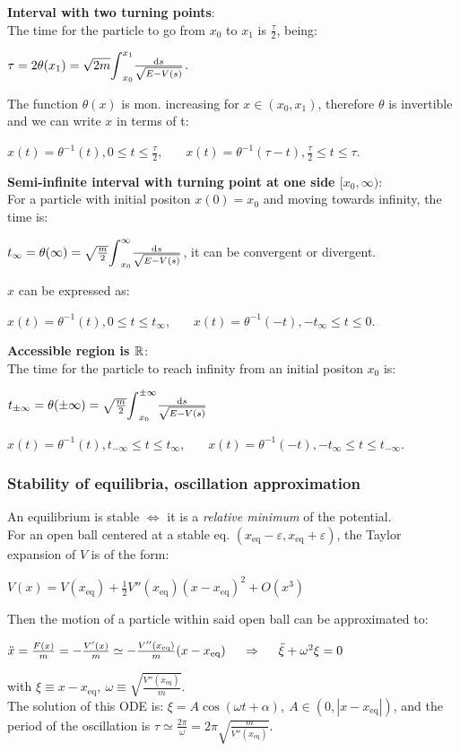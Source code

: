 \textbf{Interval with two turning points}:\\
The time for the particle to go from $x_{0}$ to $x_{1}$ is $\frac{\tau}{2}$, being:\\
\centerline{$\tau=2\theta(x_{1})=\sqrt{2m}\scaleint{5ex}_{x_{0}}^{x_{1}}\frac{\dd{s}}{\sqrt{E-V(s)}}$.}

The function $\theta(x)$ is mon. increasing for $x\in(x_{0},x_{1})$, therefore $\theta$ is invertible and we can write $x$ in terms of t:
\\[2pt]
\centerline{$x(t)=\theta^{-1}(t), 0\leq t\leq \frac{\tau}{2},\ \ \ \ \ \ \ \ 
x(t)=\theta^{-1}(\tau-t), \frac{\tau}{2}\leq t\leq \tau$.}
\smallskip

\textbf{Semi-infinite interval with turning point at one side $[x_{0},\infty)$}:\\
For a particle with initial positon $x(0)=x_{0}$ and moving towards infinity, the time is:\\
\centerline{$t_{\infty}=\theta(\infty)=\sqrt{\frac{m}{2}}\scaleint{5ex}_{x_{0}}^{\infty}\frac{\dd{s}}{\sqrt{E-V(s)}}$, it can be convergent or divergent.}
$x$ can be expressed as:\\
\centerline{$x(t)=\theta^{-1}(t), 0\leq t\leq t_{\infty},\ \ \ \ \ \ \ \ 
x(t)=\theta^{-1}(-t), -t_{\infty}\leq t\leq 0$.}
\smallskip


\textbf{Accessible region is $\mathbb{R}$}:\\
The time for the particle to reach infinity from an initial positon $x_{0}$ is:\\
\centerline{$t_{\pm \infty}=\theta(\pm\infty)=\sqrt{\frac{m}{2}}\scaleint{5ex}_{x_{0}}^{\pm\infty}\frac{\dd{s}}{\sqrt{E-V(s)}}$}
\centerline{$x(t)=\theta^{-1}(t), t_{-\infty}\leq t\leq t_{\infty},\ \ \ \ \ \ \ \ 
x(t)=\theta^{-1}(-t), -t_{\infty}\leq t\leq t_{-\infty}$.}

\smallskip

\subsubsection*{Stability of equilibria, oscillation approximation}
An equilibrium is stable $\iff$ it is a \emph{relative minimum} of the potential.\\
For an open ball centered at a stable eq. $(x_{\text{eq}}-\varepsilon,x_{\text{eq}}+\varepsilon)$, the Taylor expansion  
of $V$ is of the form:\\
\centerline{$V(x)=V(x_{\text{eq}})+\frac{1}{2}V''(x_{\text{eq}})(x-x_{\text{eq}})^{2}+O(x^{3})$}
Then the motion of a particle within said open ball can be approximated to:
\centerline{$\ddot{x}=\frac{F(x)}{m}=-\frac{V'(x)}{m}\simeq -\frac{V''(x_{\text{eq}})}{m}(x-x_{\text{eq}})\ \ \ \ \then \ \ \ \ \ddot{\xi}+\omega^{2}\xi=0$}
with $\xi\equiv x-x_{\text{eq}},\ \omega\equiv\sqrt{\frac{V''(x_{\text{eq}})}{m}}$.\\
The solution of this ODE is: $\xi=A\cos{(\omega t+\alpha)},\ A\in(0,|x-x_{\text{eq}}|)$, and the period of the oscillation is $\tau\simeq \frac{2\pi}{\omega}=2\pi\sqrt{\frac{m}{V''(x_{\text{eq}})}}$.



